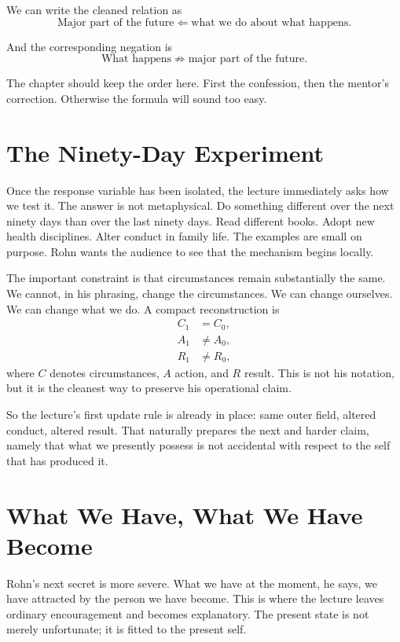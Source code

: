 We can write the cleaned relation as
\begin{equation}
\text{Major part of the future} \Longleftarrow \text{what we do about what happens}.
\end{equation}

And the corresponding negation is
\begin{equation}
\text{What happens} \not\Longrightarrow \text{major part of the future}.
\end{equation}

The chapter should keep the order here. First the confession, then the mentor's correction. Otherwise the formula will sound too easy.

\section{The Ninety-Day Experiment}

Once the response variable has been isolated, the lecture immediately asks how we test it. The answer is not metaphysical. Do something different over the next ninety days than over the last ninety days. Read different books. Adopt new health disciplines. Alter conduct in family life. The examples are small on purpose. Rohn wants the audience to see that the mechanism begins locally.

The important constraint is that circumstances remain substantially the same. We cannot, in his phrasing, change the circumstances. We can change ourselves. We can change what we do. A compact reconstruction is
\begin{align}
C_{1} &= C_{0},\\
A_{1} &\neq A_{0},\\
R_{1} &\neq R_{0},
\end{align}
where \(C\) denotes circumstances, \(A\) action, and \(R\) result. This is not his notation, but it is the cleanest way to preserve his operational claim.

So the lecture's first update rule is already in place: same outer field, altered conduct, altered result. That naturally prepares the next and harder claim, namely that what we presently possess is not accidental with respect to the self that has produced it.

\section{What We Have, What We Have Become}

Rohn's next secret is more severe. What we have at the moment, he says, we have attracted by the person we have become. This is where the lecture leaves ordinary encouragement and becomes explanatory. The present state is not merely unfortunate; it is fitted to the present self.

